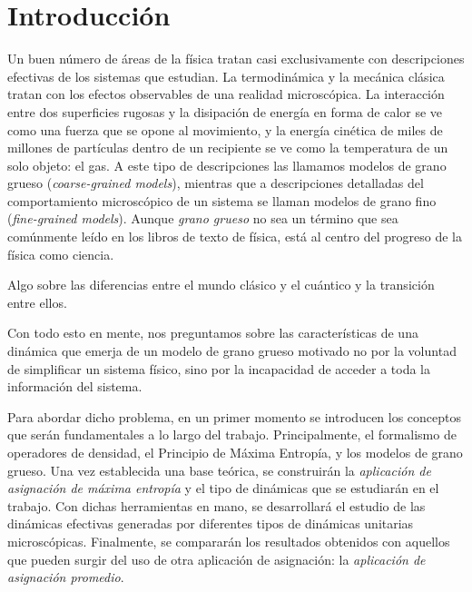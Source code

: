 \chapter{Introducción}



Un buen número de áreas de la física tratan casi exclusivamente con descripciones efectivas de los sistemas que estudian. La termodinámica y la mecánica clásica tratan con los efectos observables de una realidad microscópica. La interacción entre dos superficies rugosas y la disipación de energía en forma de calor se ve como una fuerza que se opone al movimiento, y la energía cinética de miles de millones de partículas dentro de un recipiente se ve como la temperatura de un solo objeto: el gas. A este tipo de descripciones las llamamos modelos de grano grueso (\textit{coarse-grained models}), mientras que a descripciones detalladas del comportamiento microscópico de un sistema se llaman modelos de grano fino (\textit{fine-grained models}). Aunque \textit{grano grueso} no sea un término que sea comúnmente leído en los libros de texto de física, está al centro del progreso de la física como ciencia. 



Algo sobre las diferencias entre el mundo clásico y el cuántico y la transición entre ellos.


Con todo esto en mente, nos preguntamos sobre las características de una dinámica que emerja de un modelo de grano grueso motivado no por la voluntad de simplificar un sistema físico, sino por la incapacidad de acceder a toda la información del sistema.


Para abordar dicho problema, en un primer momento se introducen los conceptos que serán fundamentales a lo largo del trabajo. Principalmente, el formalismo de operadores de densidad, el Principio de Máxima Entropía, y los modelos de grano grueso. Una vez establecida una base teórica, se construirán la \textit{aplicación de asignación de máxima entropía} y el tipo de dinámicas que se estudiarán en el trabajo. Con dichas herramientas en mano, se desarrollará el estudio de las dinámicas efectivas generadas por diferentes tipos de dinámicas unitarias microscópicas. Finalmente, se compararán los resultados obtenidos con aquellos que pueden surgir del uso de otra aplicación de asignación: la \textit{aplicación de asignación promedio}.
